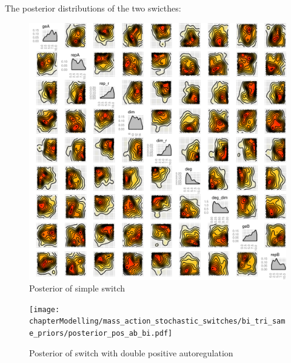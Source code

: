 The posterior distributions of the two swicthes:

\begin{figure}[t]
\begin{center}
\includegraphics[scale=0.5]{chapterModelling/mass_action_stochastic_switches/bi_stoch_images/posterior_std.pdf}
\caption{Posterior of simple switch}\label{fig_6}
\end{center}
\end{figure}

\begin{figure}[b]
\begin{center}
\texttt{[image: chapterModelling/mass\_action\_stochastic\_switches/bi\_tri\_same\_priors/posterior\_pos\_ab\_bi.pdf]}
\caption{Posterior of switch with double positive autoregulation}\label{fig_7}
\end{center}
\end{figure}


